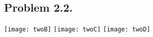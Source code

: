 \subsection{Problem 2.2.}
\texttt{[image: twoB]}
\pagebreak
\texttt{[image: twoC]}
\pagebreak
\texttt{[image: twoD]}